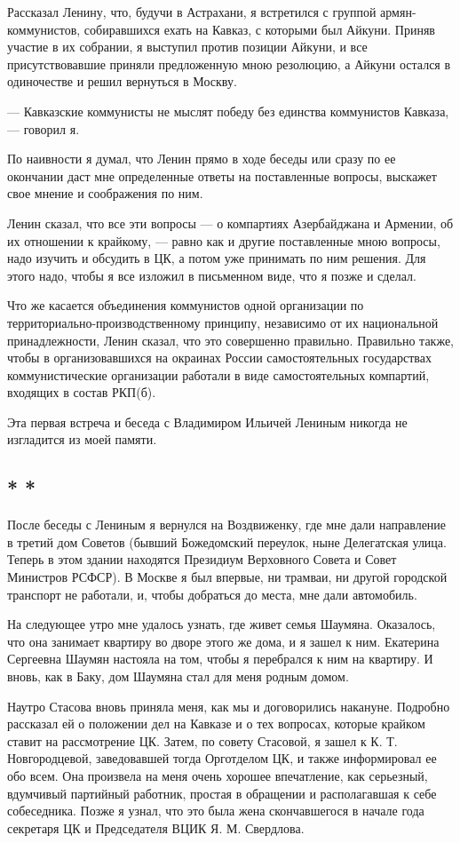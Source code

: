 \documentclass[12pt, a4paper, openany]{book}
\begin{document}
Рассказал Ленину, что, будучи в Астрахани, я встретился с группой армян-коммунистов, собиравшихся ехать на Кавказ, с которыми был Айкуни. Приняв участие в их собрании, я выступил против позиции Айкуни, и все присутствовавшие приняли предложенную мною резолюцию, а Айкуни остался в одиночестве и решил вернуться в Москву.

— Кавказские коммунисты не мыслят победу без единства коммунистов Кавказа, — говорил я.

По наивности я думал, что Ленин прямо в ходе беседы или сразу по ее окончании даст мне определенные ответы на поставленные вопросы, выскажет свое мнение и соображения по ним.

Ленин сказал, что все эти вопросы — о компартиях Азербайджана и Армении, об их отношении к крайкому, — равно как и другие поставленные мною вопросы, надо изучить и обсудить в ЦК, а потом уже принимать по ним решения. Для этого надо, чтобы я все изложил в письменном виде, что я позже и сделал.

Что же касается объединения коммунистов одной организации по территориально-производственному принципу, независимо от их национальной принадлежности, Ленин сказал, что это совершенно правильно. Правильно также, чтобы в организовавшихся на окраинах России самостоятельных государствах коммунистические организации работали в виде самостоятельных компартий, входящих в состав РКП(б).

Эта первая встреча и беседа с Владимиром Ильичей Лениным никогда не изгладится из моей памяти.

\subsection*{\center * * *}

После беседы с Лениным я вернулся на Воздвиженку, где мне дали направление в третий дом Советов (бывший Божедомский переулок, ныне Делегатская улица. Теперь в этом здании находятся Президиум Верховного Совета и Совет Министров РСФСР). В Москве я был впервые, ни трамваи, ни другой городской транспорт не работали, и, чтобы добраться до места, мне дали автомобиль.

На следующее утро мне удалось узнать, где живет семья Шаумяна. Оказалось, что она занимает квартиру во дворе этого же дома, и я зашел к ним. Екатерина Сергеевна Шаумян настояла на том, чтобы я перебрался к ним на квартиру. И вновь, как в Баку, дом Шаумяна стал для меня родным домом.

Наутро Стасова вновь приняла меня, как мы и договорились накануне. Подробно рассказал ей о положении дел на Кавказе и о тех вопросах, которые крайком ставит на рассмотрение ЦК. Затем, по совету Стасовой, я зашел к К. Т. Новгородцевой, заведовавшей тогда Орготделом ЦК, и также информировал ее обо всем. Она произвела на меня очень хорошее впечатление, как серьезный, вдумчивый партийный работник, простая в обращении и располагавшая к себе собеседника. Позже я узнал, что это была жена скончавшегося в начале года секретаря ЦК и Председателя ВЦИК Я. М. Свердлова.
\end{document}
